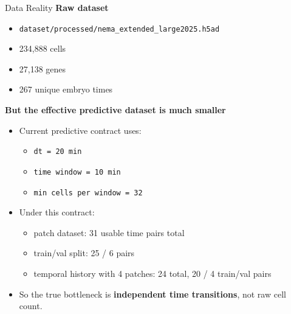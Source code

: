 \documentclass[aspectratio=169,11pt]{beamer}
\begin{document}
\begin{frame}{Data Reality}
\textbf{Raw dataset}
\begin{itemize}
    \item \texttt{dataset/processed/nema\_extended\_large2025.h5ad}
    \item 234,888 cells
    \item 27,138 genes
    \item 267 unique embryo times
\end{itemize}

\vspace{0.5em}
\textbf{But the effective predictive dataset is much smaller}
\begin{itemize}
    \item Current predictive contract uses:
    \begin{itemize}
        \item \texttt{dt = 20 min}
        \item \texttt{time window = 10 min}
        \item \texttt{min cells per window = 32}
    \end{itemize}
    \item Under this contract:
    \begin{itemize}
        \item patch dataset: 31 usable time pairs total
        \item train/val split: 25 / 6 pairs
        \item temporal history with 4 patches: 24 total, 20 / 4 train/val pairs
    \end{itemize}
    \item So the true bottleneck is \textbf{independent time transitions}, not raw cell count.
\end{itemize}
\end{frame}
\end{document}
